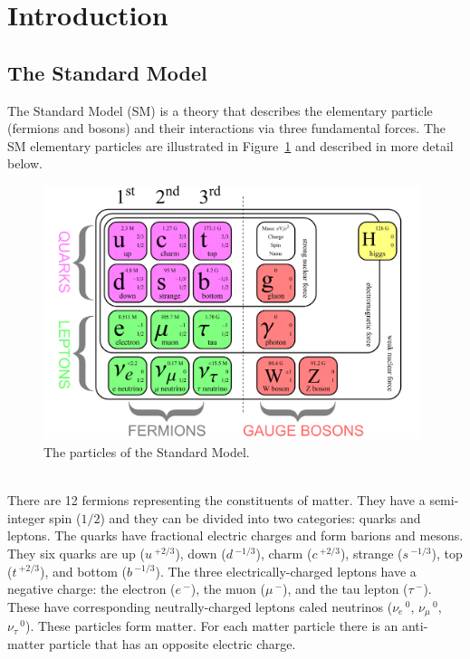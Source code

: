 \newpage

\section{Introduction}
\label{sec:Introduction}

\subsection{The Standard Model}
\label{sec:StandardModel}

The Standard Model (SM) is a theory that describes the elementary particle (fermions and bosons) and their interactions via three fundamental forces. The SM elementary particles are illustrated in Figure~\ref{fig:SMParticles} and described in more detail below.

\begin{figure}[h]
  \centering
  \includegraphics[width=0.98\textwidth]{./plots/SM.png}
  \caption{The particles of the Standard Model.}
  \label{fig:SMParticles}
\end{figure}

\ \\There are 12 fermions representing the constituents of matter. They have a semi-integer spin ($1/2$) and they can be divided into two categories: quarks and leptons. The quarks have fractional electric charges and form barions and mesons. They six quarks are up ($u\,^{+2/3}$), down ($d\,^{-1/3}$), charm ($c\,^{+2/3}$), strange ($s\,^{-1/3}$), top ($t\,^{+2/3}$), and bottom ($b\,^{-1/3}$). The three electrically-charged leptons have a negative charge: the electron ($e\,^{-}$), the muon ($\mu\,^{-}$), and the tau lepton ($\tau\,^{-}$). These have corresponding neutrally-charged leptons caled neutrinos ($\nu_e\,^0$, $\nu_\mu\,^0$, $\nu_\tau\,^0$). These particles form matter. For each matter particle there is an anti-matter particle that has an opposite electric charge. 

